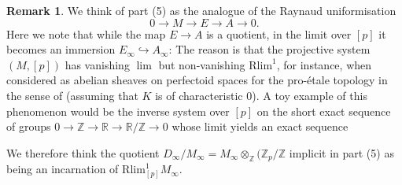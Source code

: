 \documentclass[10pt,oneside]{amsart}
\theoremstyle{definition}
\newtheorem{remark}[theorem]{Remark}
\newcommand{\Z}{\mathbb{Z}}
\begin{document}
	\begin{remark}
	We think of part (5) as the analogue of the Raynaud uniformisation
		\[0\to M\to E\to A\to 0.\]
	Here we note that while the map $E\to A$ is a quotient, in the limit over $[p]$ it becomes an immersion $E_\infty\hookrightarrow A_\infty$: The reason is that the projective system $(M,[p])$ has vanishing $\lim$ but non-vanishing $\mathrm{Rlim}^1$, for instance, when considered as abelian sheaves on perfectoid spaces for the pro-\'etale topology in the sense of \cite{etale_cohomology_of_diamonds} (assuming that $K$ is of characteristic $0$). A toy example of this phenomenon would be the inverse system over $[p]$ on the short exact sequence of groups 
	$0 \to\mathbb Z \to\mathbb R \to \mathbb R/\mathbb Z \to 0$
	whose limit yields an exact sequence
	\begin{center}
	\end{center}
	We therefore think the quotient $D_\infty/M_\infty=M_\infty\otimes_{\Z}(\Z_p/\Z$ implicit in part (5) as being an incarnation of $\mathrm{Rlim}^1_{[p]}M_\infty$.
\end{remark}
\end{document}
